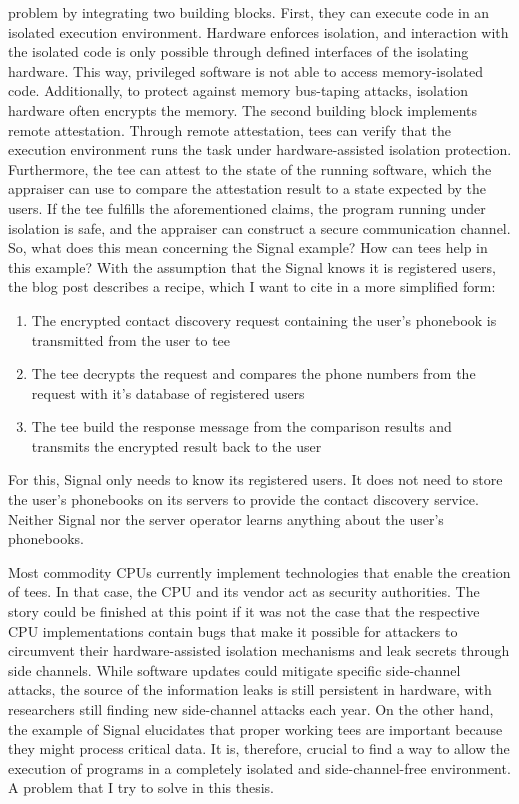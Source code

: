 problem by integrating two building blocks. First, they can execute code in an
isolated execution environment. Hardware enforces isolation, and interaction
with the isolated code is only possible through defined interfaces of the
isolating hardware. This way, privileged software is not able to access
memory-isolated code. Additionally, to protect against memory bus-taping
attacks, isolation hardware often encrypts the memory. The second building block
implements remote attestation. Through remote attestation, \glspl{tee} can
verify that the execution environment runs the task under hardware-assisted
isolation protection. Furthermore, the \gls{tee} can attest to the state of the
running software, which the appraiser can use to compare the attestation result
to a state expected by the users. If the \gls{tee} fulfills the aforementioned
claims, the program running under isolation is safe, and the appraiser can
construct a secure communication channel.\\

So, what does this mean concerning the Signal example? How can \glspl{tee}
help in this example? With the assumption that the Signal knows it is registered
users, the blog post describes a recipe, which I want to cite in a more
simplified form:
\begin{enumerate}
    \item The encrypted contact discovery request containing the user's phonebook
          is transmitted from the user to
          \gls{tee}
    \item The \gls{tee} decrypts the request and compares the phone numbers from
          the request with it's database of registered users
    \item The \gls{tee} build the response message from the comparison results
          and transmits the encrypted result back to the user
\end{enumerate}
For this, Signal only needs to know its registered users. It does not need to
store the user's phonebooks on its servers to provide the contact discovery
service. Neither Signal nor the server operator learns anything about the user's
phonebooks.

Most commodity CPUs currently implement technologies that enable the creation of
\glspl{tee}. In that case, the CPU and its vendor act as security
authorities.\cite{tdx_whitepaper,kaplan_amd_2020,pinto_demystifying_2019,costan2016intel}
The story could be finished at this point if it was not the case that the
respective CPU implementations contain bugs that make it possible for attackers
to circumvent their hardware-assisted isolation mechanisms and leak secrets
through side
channels.\cite{kocher_spectre_2020,lipp_meltdown_2020,nilsson_survey_2020} While
software updates could mitigate specific side-channel attacks, the source of the
information leaks is still persistent in hardware, with researchers still
finding new side-channel attacks each
year.\cite{wikner2022retbleed,moghimi_downfall_2023,ragab_ghostrace_2024} On the
other hand, the example of Signal elucidates that proper working \glspl{tee} are
important because they might process critical data. It is, therefore, crucial to
find a way to allow the execution of programs in a completely isolated and
side-channel-free environment. A problem that I try to solve in this thesis.
